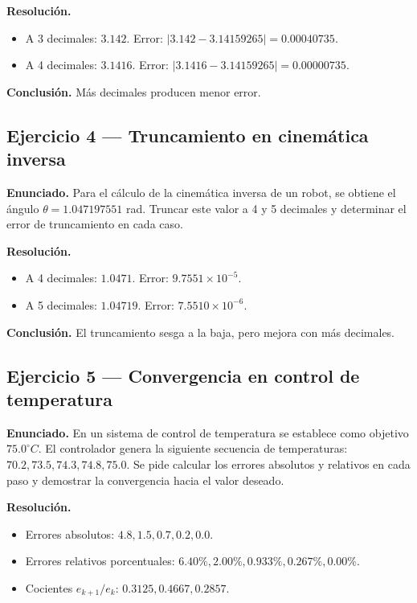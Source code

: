 \documentclass[12pt,a4paper]{report}
\begin{document}
	\textbf{Resolución.}
	\begin{itemize}
		\item A 3 decimales: $3.142$. Error: $|3.142-3.14159265|=0.00040735$.
		\item A 4 decimales: $3.1416$. Error: $|3.1416-3.14159265|=0.00000735$.
	\end{itemize}
	
	\textbf{Conclusión.} Más decimales producen menor error.
	
	\subsection*{Ejercicio 4 --- Truncamiento en cinemática inversa}
	
	\textbf{Enunciado.} Para el cálculo de la cinemática inversa de un robot, se obtiene el ángulo $\theta=1.047197551$ rad. Truncar este valor a 4 y 5 decimales y determinar el error de truncamiento en cada caso.
	
	\textbf{Resolución.}
	\begin{itemize}
		\item A 4 decimales: $1.0471$. Error: $9.7551\times10^{-5}$.
		\item A 5 decimales: $1.04719$. Error: $7.5510\times10^{-6}$.
	\end{itemize}
	
	\textbf{Conclusión.} El truncamiento sesga a la baja, pero mejora con más decimales.
	
	\subsection*{Ejercicio 5 --- Convergencia en control de temperatura}
	
	\textbf{Enunciado.} En un sistema de control de temperatura se establece como objetivo $75.0^\circ C$. El controlador genera la siguiente secuencia de temperaturas: $70.2, 73.5, 74.3, 74.8, 75.0$. Se pide calcular los errores absolutos y relativos en cada paso y demostrar la convergencia hacia el valor deseado.
	
	\textbf{Resolución.}
	\begin{itemize}
		\item Errores absolutos: $4.8, 1.5, 0.7, 0.2, 0.0$.
		\item Errores relativos porcentuales: $6.40\%, 2.00\%, 0.933\%, 0.267\%, 0.00\%$.
		\item Cocientes $e_{k+1}/e_k$: $0.3125, 0.4667, 0.2857$.
	\end{itemize}
	
\end{document}
